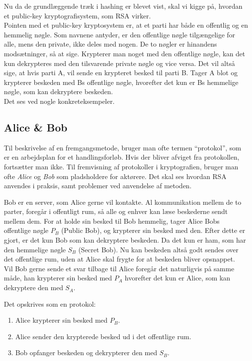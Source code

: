 Nu da de grundlæggende træk i hashing er blevet vist, skal vi kigge på, hvordan et public-key kryptografisystem, som RSA virker.\\
Pointen med et public-key kryptosystem er, at et parti har både en offentlig og en hemmelig nøgle.
Som navnene antyder, er den offentlige nøgle tilgængelige for alle, mens den private, ikke deles med nogen.
De to nøgler er hinandens modsætninger, så at sige.
Krypterer man noget med den offentlige nøgle, kan det kun dekrypteres med den tilsvarende private nøgle og vice versa.
Det vil altså sige, at hvis parti A, vil sende en krypteret besked til parti B. Tager A blot og krypterer beskeden med Bs offentlige nøgle, hvorefter det kun er Bs hemmelige nøgle, som kan dekryptere beskeden.\cite[22]{au}\\
Det ses ved nogle konkreteksempeler.

\subsection{Alice \& Bob}
Til beskrivelse af en fremgangsmetode, bruger man ofte termen ``protokol'', som er en arbejdsplan for et handlingsforløb.
Hvis der bliver afviget fra protokollen, fortsætter man ikke.
Til fremvisning af protokoller i kryptografien, bruger man ofte \emph{Alice} og \emph{Bob} som pladsholdere for aktørere.
Det skal ses hvordan RSA anvendes i praksis, samt problemer ved anvendelse af metoden.

\begin{eks}
    \label{genrsa}
    Bob er en server, som Alice gerne vil kontakte.
    Al kommunikation mellem de to parter, foregår i offentligt rum, så alle og enhver kan læse beskederne sendt mellem dem.
    For at holde sin besked til Bob hemmelig, tager Alice Bobs offentlige nøgle \(P_B\) (Public Bob), og krypterer sin besked med den.
    Efter dette er gjort, er det kun Bob som kan dekryptere beskeden. Da det kun er ham, som har den hemmelige nøgle \(S_B\) (Secret Bob).
    Nu kan beskeden altså godt sendes over det offentlige rum, uden at Alice skal frygte for at beskeden bliver opsnappet.\\
    Vil Bob gerne sende et svar tilbage til Alice foregår det naturligvis på samme måde, han krypterer sin besked med \(P_A\) hvorefter det kun er Alice, som kan dekryptere den med \(S_A\).
    \par
    Det opskrives som en protokol:
    \begin{enumerate}[label*=(\arabic*)]%
        \item Alice krypterer sin besked med \(P_B\).
        \item Alice sender den krypterede besked ud i det offentlige rum.
        \item Bob opfanger beskeden og dekrypterer den med \(S_B\).
    \end{enumerate}
\end{eks}

